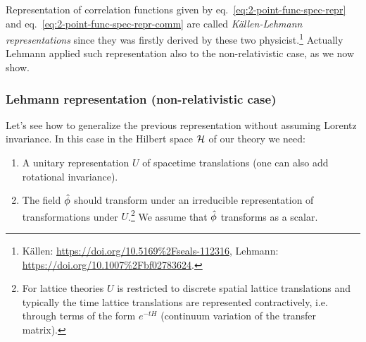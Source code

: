 \documentclass[../main/main.tex]{subfiles}
\begin{document}
Representation of correlation functions given by eq.~\eqref{eq:2-point-func-spec-repr} and eq.~\eqref{eq:2-point-func-spec-repr-comm} are called \emph{Källen-Lehmann representations} since they was firstly derived by these two physicist.\footnote{Källen: \url{https://doi.org/10.5169\%2Fseals-112316}, Lehmann: \url{https://doi.org/10.1007\%2Fbf02783624}.} Actually Lehmann applied such representation also to the non-relativistic case, as we now show.

\subsubsection{Lehmann representation (non-relativistic case)}

Let's see how to generalize the previous representation without assuming Lorentz invariance. In this case in the Hilbert space $\mathcal H$ of our theory we need:
\begin{enumerate}[label=(\arabic*')]
	\item A unitary representation $U$ of spacetime translations (one can also add rotational invariance).
	\item The field $\hat{\phi}$ should transform under an irreducible representation of transformations under $U$.\footnote{For lattice theories $U$ is restricted to discrete spatial lattice translations and typically the time lattice translations are represented contractively, i.e. through terms of the form $e^{-tH}$ (continuum variation of the transfer matrix).} We assume that $\hat{\phi}$ transforms as a scalar. 
\end{enumerate}

\end{document}
